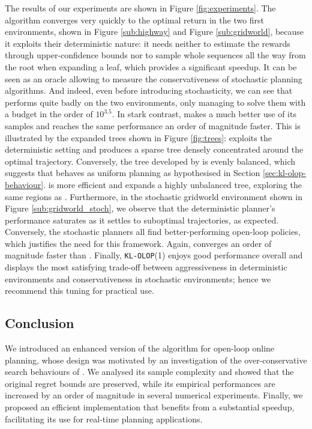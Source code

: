 The results of our experiments are shown in Figure \ref{fig:experiments}. The \OPD algorithm converges very quickly to the optimal return in the two first environments, shown in Figure \ref{sub:highway} and Figure \ref{sub:gridworld}, because it exploits their deterministic nature: it needs neither to estimate the rewards through upper-confidence bounds nor to sample whole sequences all the way from the root when expanding a leaf, which provides a significant speedup. It can be seen as an oracle allowing to measure the conservativeness of stochastic planning algorithms. And indeed, even before introducing stochasticity, we can see that \OLOP performs quite badly on the two environments, only managing to solve them with a budget in the order of $10^{3.5}$. In stark contrast, \KLOLOP makes a much better use of its samples and reaches the same performance an order of magnitude faster. This is illustrated by the expanded trees shown in Figure \ref{fig:trees}: \OPD exploits the deterministic setting and produces a sparse tree densely concentrated around the optimal trajectory. Conversely, the tree developed by \OLOP is evenly balanced, which suggests that \OLOP behaves as uniform planning as hypothesised in Section \ref{sec:kl-olop-behaviour}. \KLOLOP is more efficient and expands a highly unbalanced tree, exploring the same regions as \OPD. Furthermore, in the stochastic gridworld environment shown in Figure \ref{sub:gridworld_stoch}, we observe that the deterministic \OPD planner's performance saturates as it settles to suboptimal trajectories, as expected. Conversely, the stochastic planners all find better-performing open-loop policies, which justifies the need for this framework. Again, \KLOLOP converges an order of magnitude faster than \OLOP. Finally, \texttt{KL-OLOP}(1) enjoys good performance overall and displays the most satisfying trade-off between aggressiveness in deterministic environments and conservativeness in stochastic environments; hence we recommend this tuning for practical use.

\subsection{Conclusion}

We introduced an enhanced version of the \OLOP algorithm for open-loop online planning, whose design was motivated by an investigation of the over-conservative search behaviours of \OLOP. We analysed its sample complexity and showed that the original regret bounds are preserved, while its empirical performances are increased by an order of magnitude in several numerical experiments. Finally, we proposed an efficient implementation that benefits from a substantial speedup, facilitating its use for real-time planning applications.


